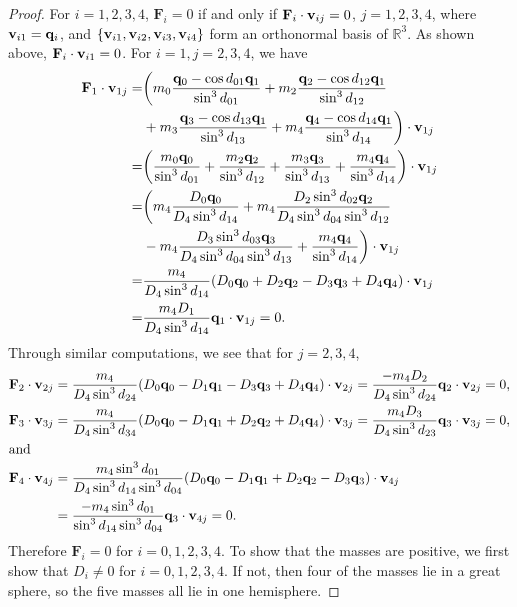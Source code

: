 \documentclass[12pt]{amsart}
\theoremstyle{definition}
\def \mb{\mathbb}
\def \R{\mb R}                 %
\def\v{{\bf v}}
\newcommand {\q} {\mathbf{q}}
\newcommand {\F} {\mathbf{F}}
\begin{document}
{\begin{proof}
For $i=1,2,3,4$, $\F_i=0$ if and only if $\F_i \cdot \v_{ij}=0$, $j=1,2,3,4$, where $\v_{i1}=\q_i$, and $\{\v_{i1}, \v_{i2}, \v_{i3}, \v_{i4}\}$ form an orthonormal basis of $\R^3$. As shown above, $\F_i \cdot \v_{i1}=0$. For $i=1, j=2,3,4$, we have \begin{align*}
\F_1 \cdot \v_{1j}= &\biggl(m_0\frac{\q_0-\cos{d_{01}}\q_1}{\sin^3{d_{01}}}+m_2\frac{\q_2-\cos{d_{12}}\q_1}{\sin^3{d_{12}}}\\
&+m_3\frac{\q_3-\cos{d_{13}}\q_1}{\sin^3{d_{13}}}+m_4\frac{\q_4-\cos{d_{14}}\q_1}{\sin^3{d_{14}}}\biggr)\cdot  \v_{1j}\\
=&\biggl(\frac{m_0\q_0}{\sin^3{d_{01}}}+\frac{m_2\q_2}{\sin^3{d_{12}}}+\frac{m_3\q_3}{\sin^3{d_{13}}}+\frac{m_4\q_4}{\sin^3{d_{14}}}\biggr)\cdot \v_{1j}\\
=&\biggl(m_4\frac{D_0\q_0}{D_4\sin^3{d_{14}}}+m_4\frac{D_2\sin^3{d_{02}}\q_2}{D_4\sin^3{d_{04}}\sin^3{d_{12}}}\\
&-m_4\frac{D_3\sin^3{d_{03}}\q_3}{D_4\sin^3{d_{04}}\sin^3{d_{13}}}+\frac{m_4\q_4}{\sin^3{d_{14}}}\biggr)\cdot \v_{1j}\\
=&\frac{m_4}{D_4\sin^3{d_{14}}}(D_0\q_0+D_2\q_2-D_3\q_3+D_4\q_4)\cdot \v_{1j}\\
=&\frac{m_4D_1}{D_4\sin^3{d_{14}}}\q_1\cdot \v_{1j}=0.
\end{align*}
Through similar computations, we see that for $j=2,3,4$, \begin{align*}
\F_2\cdot \v_{2j}&=\frac{m_4}{D_4\sin^3{d_{24}}}(D_0\q_0-D_1\q_1-D_3\q_3+D_4\q_4)\cdot \v_{2j}=\frac{-m_4D_2}{D_4\sin^3{d_{24}}}\q_2\cdot \v_{2j}=0,\\
\F_3\cdot \v_{3j}&=\frac{m_4}{D_4\sin^3{d_{34}}}(D_0\q_0-D_1\q_1+D_2\q_2+D_4\q_4)\cdot \v_{3j}=\frac{m_4D_3}{D_4\sin^3{d_{23}}}\q_3\cdot \v_{3j}=0,\\
\intertext{and}
\F_4 \cdot \v_{4j}&=\frac{m_4\sin^3{d_{01}}}{D_4\sin^3{d_{14}}\sin^3{d_{04}}}(D_0\q_0-D_1\q_1+D_2\q_2-D_3\q_3)\cdot \v_{4j}\\
&=\frac{-m_4\sin^3{d_{01}}}{\sin^3{d_{14}}\sin^3{d_{04}}}\q_3\cdot \v_{4j}=0.\end{align*}
Therefore $\F_i=0$ for $i=0,1,2,3,4$. To show that the masses are positive, we first show that $D_i \neq 0$ for $i=0,1,2,3,4$. If not, then four of the masses lie in a great sphere, so the five masses all lie in one hemisphere.
\smallskip


\end{proof}}
\end{document}
